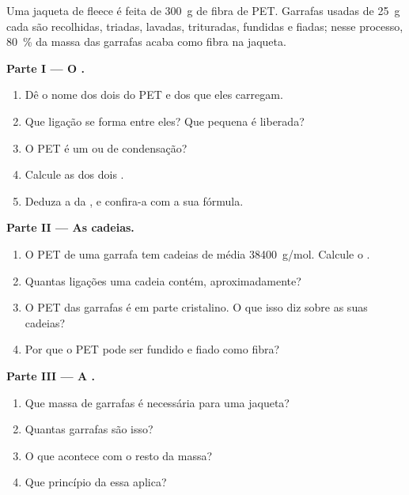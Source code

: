 \begin{problem}
\label{pb:g12:polymers:1}
Uma jaqueta de fleece é feita de \qty{300}{g} de fibra de PET. Garrafas
usadas de \qty{25}{g} cada são recolhidas, triadas, lavadas, trituradas,
fundidas e fiadas; nesse processo, \qty{80}{\percent} da massa das
garrafas acaba como fibra na jaqueta.

\medskip
\noindent\textbf{Parte I --- O .}
\begin{enumerate}
  \item Dê o nome dos dois  do PET e dos  que
        eles carregam.
  \item Que ligação se forma entre eles? Que  pequena é
        liberada?
  \item O PET é um  ou de condensação?
  \item Calcule as  dos dois .
  \item Deduza a  da  , e
        confira-a com a sua fórmula.
\end{enumerate}

\medskip
\noindent\textbf{Parte II --- As cadeias.}
\begin{enumerate}[resume]
  \item O PET de uma garrafa tem cadeias de  média
        \qty{38400}{g/mol}. Calcule o .
  \item Quantas ligações  uma cadeia contém, aproximadamente?
  \item O PET das garrafas é em parte cristalino. O que isso diz sobre
        as suas cadeias?
  \item Por que o PET pode ser fundido e fiado como fibra?
\end{enumerate}

\medskip
\noindent\textbf{Parte III --- A .}
\begin{enumerate}[resume]
  \item Que massa de garrafas é necessária para uma jaqueta?
  \item Quantas garrafas são isso?
  \item O que acontece com o resto da massa?
  \item Que princípio da  essa  aplica?
\end{enumerate}


\end{problem}
